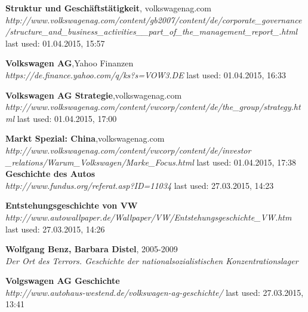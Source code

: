 \documentclass[12pt]{article}
\begin{document}
\begin{thebibliography}{56}
 \textbf{Struktur und Geschäftstätigkeit}, volkswagenag.com \\
  \textit{	http://www.volkswagenag.com/content/gb2007/content/de/corporate\_governance\\/structure\_and\_business\_activities\_\_part\_of\_the\_management\_report\_.html}
  \newline last used: 01.04.2015, 15:57  

 \textbf{Volkswagen AG},Yahoo Finanzen \\
  \textit{  https://de.finance.yahoo.com/q/ks?s=VOW3.DE}
  \newline last used: 01.04.2015, 16:33  
  
 \textbf{Volkswagen AG Strategie},volkswagenag.com \\
  \textit{http://www.volkswagenag.com/content/vwcorp/content/de/the\_group/strategy.html}
  \newline last used: 01.04.2015, 17:00  
    
 \textbf{Markt Spezial: China},volkswagenag.com \\
  \textit{http://www.volkswagenag.com/content/vwcorp/content/de/investor\\\_relations/Warum\_Volkswagen/Marke\_Focus.html
}
  \newline last used: 01.04.2015, 17:38
  \textbf{Geschichte des Autos} \\
  \textit{
  	http://www.fundus.org/referat.asp?ID=11034
  }
  \newline last used: 27.03.2015, 14:23
  
  
  \textbf{Entstehungsgeschichte von VW} \\
  \textit{
  	http://www.autowallpaper.de/Wallpaper/VW/Entstehungsgeschichte\_VW.htm
  }
  \newline last used: 27.03.2015, 14:26
  
  \textbf{Wolfgang Benz, Barbara Distel}, 2005-2009 \\
  \textit{
  	Der Ort des Terrors. Geschichte der nationalsozialistischen Konzentrationslager
  }
  
  
  \textbf{Volgswagen AG Geschichte} \\
  \textit{
  	http://www.autohaus-westend.de/volkswagen-ag-geschichte/
  }
  \newline last used: 27.03.2015, 13:41
  

\end{thebibliography}
\end{document}
